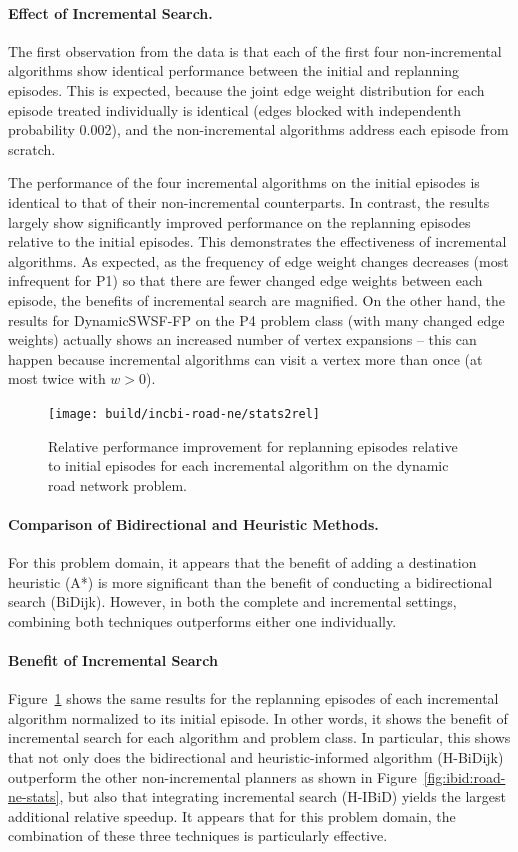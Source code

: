 \paragraph{Effect of Incremental Search.}
The first observation from the data is that
each of the first four non-incremental algorithms
show identical performance between the initial and replanning
episodes.
This is expected,
because the joint edge weight distribution for each episode treated
individually is identical
(edges blocked with independenth probability 0.002),
and the non-incremental algorithms address each episode from scratch.

The performance of the four incremental algorithms on the initial
episodes is identical to that of their non-incremental counterparts.
In contrast, the results largely show
significantly improved performance on the replanning episodes
relative to the initial episodes.
This demonstrates the effectiveness of incremental algorithms.
As expected,
as the frequency of edge weight changes decreases
(most infrequent for P1)
so that there are fewer changed edge weights between each episode,
the benefits of incremental search are magnified.
On the other hand,
the results for DynamicSWSF-FP on the P4 problem class
(with many changed edge weights)
actually shows an increased number of vertex expansions --
this can happen because incremental algorithms can visit a vertex
more than once (at most twice with $w>0$).

\begin{figure}
   \centering
   \texttt{[image: build/incbi-road-ne/stats2rel]}
   \caption{Relative performance improvement for replanning episodes
      relative to initial episodes for each incremental algorithm
      on the dynamic road network problem.}
   \label{fig:ibid:road-ne-stats-rel}
\end{figure}

\paragraph{Comparison of Bidirectional and Heuristic Methods.}
For this problem domain,
it appears that the benefit of adding a destination heuristic (A*)
is more significant than the benefit of conducting a bidirectional
search (BiDijk).
However, in both the complete and incremental settings,
combining both techniques outperforms either one individually.

\paragraph{Benefit of Incremental Search}
Figure~\ref{fig:ibid:road-ne-stats-rel} shows the same results
for the replanning episodes of each incremental algorithm
normalized to its initial episode.
In other words,
it shows the benefit of incremental search for each algorithm
and problem class.
In particular,
this shows that not only does the bidirectional and heuristic-informed
algorithm (H-BiDijk) outperform the other non-incremental planners
as shown in Figure~\ref{fig:ibid:road-ne-stats},
but also that integrating incremental search (H-IBiD)
yields the largest additional relative speedup.
It appears that for this problem domain,
the combination of these three techniques is particularly effective.

